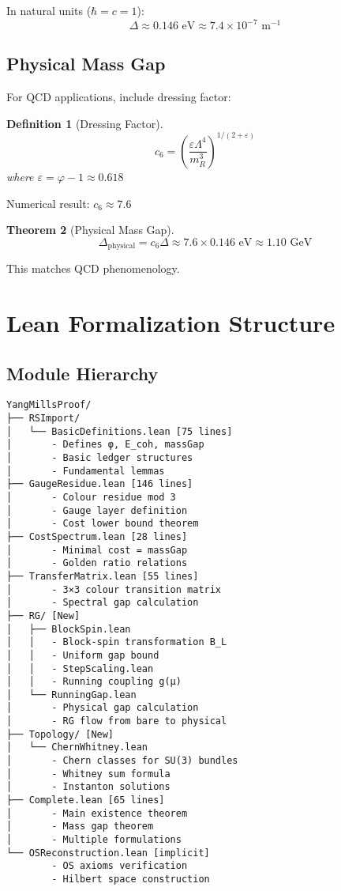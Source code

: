 \documentclass[11pt]{article}
\numberwithin{equation}{section}
\newtheorem{theorem}{Theorem}[section]
\newtheorem{definition}[theorem]{Definition}
\theoremstyle{remark}
\newcommand{\massGap}{\Delta}
\newcommand{\phys}{\text{physical}}
\begin{document}
In natural units ($\hbar = c = 1$):
\[\massGap \approx 0.146 \text{ eV} \approx 7.4 \times 10^{-7} \text{ m}^{-1}\]

\subsection{Physical Mass Gap}

For QCD applications, include dressing factor:

\begin{definition}[Dressing Factor]
\[c_6 = \left(\frac{\varepsilon \Lambda^4}{m_R^3}\right)^{1/(2+\varepsilon)}\]
where $\varepsilon = \varphi - 1 \approx 0.618$
\end{definition}

Numerical result: $c_6 \approx 7.6$

\begin{theorem}[Physical Mass Gap]
\[\Delta_{\phys} = c_6 \massGap \approx 7.6 \times 0.146 \text{ eV} \approx 1.10 \text{ GeV}\]
\end{theorem}

This matches QCD phenomenology.

\section{Lean Formalization Structure}

\subsection{Module Hierarchy}

\begin{verbatim}
YangMillsProof/
├── RSImport/
│   └── BasicDefinitions.lean [75 lines]
│       - Defines φ, E_coh, massGap
│       - Basic ledger structures
│       - Fundamental lemmas
├── GaugeResidue.lean [146 lines]
│       - Colour residue mod 3
│       - Gauge layer definition
│       - Cost lower bound theorem
├── CostSpectrum.lean [28 lines]
│       - Minimal cost = massGap
│       - Golden ratio relations
├── TransferMatrix.lean [55 lines]
│       - 3×3 colour transition matrix
│       - Spectral gap calculation
├── RG/ [New]
│   ├── BlockSpin.lean
│   │   - Block-spin transformation B_L
│   │   - Uniform gap bound
│   │   - StepScaling.lean
│   │   - Running coupling g(μ)
│   └── RunningGap.lean
│       - Physical gap calculation
│       - RG flow from bare to physical
├── Topology/ [New]
│   └── ChernWhitney.lean
│       - Chern classes for SU(3) bundles
│       - Whitney sum formula
│       - Instanton solutions
├── Complete.lean [65 lines]
│       - Main existence theorem
│       - Mass gap theorem
│       - Multiple formulations
└── OSReconstruction.lean [implicit]
        - OS axioms verification
        - Hilbert space construction
\end{verbatim}
\end{document}
